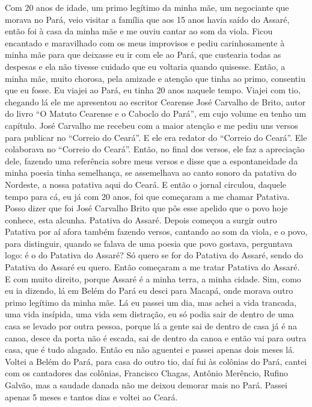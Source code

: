 Com 20 anos de idade, um primo legítimo da minha mãe, um negociante que
morava no Pará, veio visitar a família que aos 15 anos havia saído do
Assaré, então foi à casa da minha mãe e me ouviu cantar ao som da viola.
Ficou encantado e maravilhado com os meus improvisos e pediu
carinhosamente à minha mãe para que deixasse eu ir com ele ao Pará, que
custearia todas as despesas e ela não tivesse cuidado que eu voltaria
quando quisesse. Então, a minha mãe, muito chorosa, pela amizade e
atenção que tinha ao primo, consentiu que eu fosse. Eu viajei ao Pará,
eu tinha 20 anos naquele tempo. Viajei com tio, chegando lá ele me
apresentou ao escritor Cearense José Carvalho de Brito, autor do livro
``O Matuto Cearense e o Caboclo do Pará'', em cujo volume eu tenho um
capítulo. José Carvalho me recebeu com a maior atenção e me pediu uns
versos para publicar no ``Correio do Ceará''. E ele era redator do
``Correio do Ceará''. Ele colaborava no ``Correio do Ceará''. Então, no
final dos versos, ele faz a apreciação dele, fazendo uma referência
sobre meus versos e disse que a espontaneidade da minha poesia tinha
semelhança, se assemelhava ao canto sonoro da patativa do Nordeste, a
nossa patativa aqui do Ceará. E então o jornal circulou, daquele tempo
para cá, eu já com 20 anos, foi que começaram a me chamar Patativa.
Posso dizer que foi José Carvalho Brito que pôs esse apelido que o povo
hoje conhece, esta alcunha. Patativa do Assaré. Depois começou a surgir
outro Patativa por aí afora também fazendo versos, cantando ao som da
viola, e o povo, para distinguir, quando se falava de uma poesia que
povo gostava, perguntava logo: é o do Patativa do Assaré? Só quero se
for do Patativa do Assaré, sendo do Patativa do Assaré eu quero. Então
começaram a me tratar Patativa do Assaré. E com muito direito, porque
Assaré é a minha terra, a minha cidade. Sim, como eu ia dizendo, lá em
Belém do Pará eu desci para Macapá, onde morava outro primo legítimo
da minha mãe. Lá eu passei um dia, mas achei a vida trancada, uma vida
insípida, uma vida sem distração, eu só podia sair de dentro de uma casa
se levado por outra pessoa, porque lá a gente sai de dentro de casa já é
na canoa, desce da porta não é escada, sai de dentro da canoa e então
vai para outra casa, que é tudo alagado. Então eu não aguentei e
passei apenas dois meses lá. Voltei a Belém do Pará, para casa do outro
tio, daí fui às colônias do Pará, cantei com os cantadores das colônias,
Francisco Chagas, Antônio Merêncio, Rufino Galvão, mas a saudade danada
não me deixou demorar mais no Pará. Passei apenas 5 meses e tantos dias
e voltei ao Ceará.

